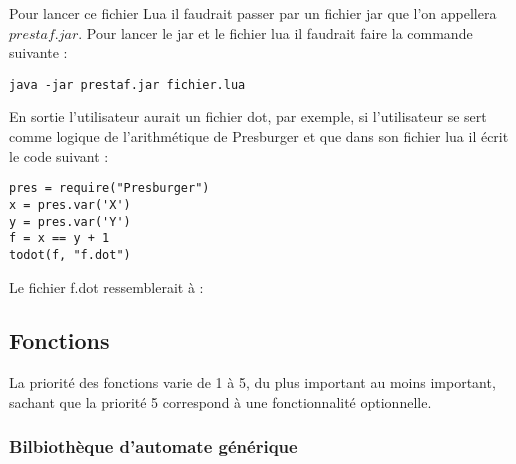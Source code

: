 \documentclass{article}%
\begin{document}
Pour lancer ce fichier Lua il faudrait passer par un fichier jar que l'on appellera $prestaf.jar$. Pour lancer le jar et le fichier lua il faudrait faire la commande suivante :

\begin{lstlisting}[mathescape=true, frame=single]
java -jar prestaf.jar fichier.lua
\end{lstlisting}

En sortie l'utilisateur aurait un fichier dot, par exemple, si l'utilisateur se sert comme logique de l'arithmétique de Presburger et que dans son fichier lua il écrit le code suivant :

\begin{lstlisting}[mathescape=true, frame=single]
pres = require("Presburger")
x = pres.var('X')
y = pres.var('Y')
f = x == y + 1
todot(f, "f.dot")
\end{lstlisting}

Le fichier f.dot ressemblerait à :


\subsection{Fonctions}

La priorité des fonctions varie de 1 à 5, du plus important au moins important, sachant que la priorité 5 correspond à une fonctionnalité optionnelle.

\subsubsection{Bilbiothèque d'automate générique}
\end{document}
